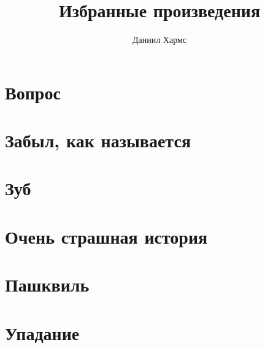 \documentclass[12pt, a5paper]{article}
\title{Избранные произведения}
\author{Даниил Хармс}
\date{}
\begin{document}
\maketitle

\section{Вопрос}


\section{Забыл, как называется}


\section{Зуб}


\section{Очень страшная история}


\section{Пашквиль}


\section{Упадание}

\end{document}
